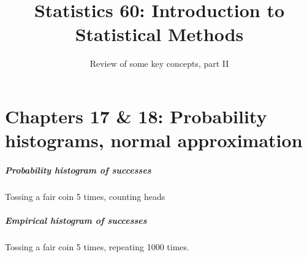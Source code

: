 \documentclass[handout]{beamer}
\title{Statistics 60: Introduction to Statistical Methods}
\subtitle{Review of some key concepts, part II}
\author{}%
\begin{document}
   \begin{frame}
   \titlepage
   \end{frame}

   \part{Chapters 17 \& 18: Probability histograms, normal approximation}
   \frame{\partpage}



   \begin{frame}
   \frametitle{Probability histogram of successes}
   \begin{center}
   \end{center}
   Tossing a fair coin 5 times, counting heads
   \end{frame}



   \begin{frame}
   \frametitle{Empirical histogram of successes}
   \begin{center}
   \end{center}
   Tossing a fair coin 5 times, repeating 1000 times.
   \end{frame}
\end{document}
